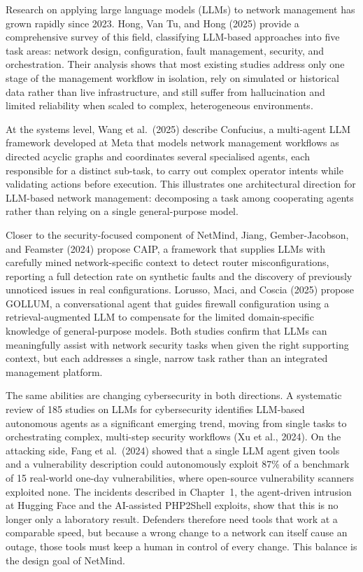 
Research on applying large language models (LLMs) to network management has
grown rapidly since 2023. Hong, Van Tu, and Hong (2025) provide a
comprehensive survey of this field, classifying LLM-based approaches into
five task areas: network design, configuration, fault management, security,
and orchestration. Their analysis shows that most existing studies address
only one stage of the management workflow in isolation, rely on simulated or
historical data rather than live infrastructure, and still suffer from
hallucination and limited reliability when scaled to complex, heterogeneous
environments.

At the systems level, Wang et al.\ (2025) describe Confucius, a multi-agent
LLM framework developed at Meta that models network management workflows as
directed acyclic graphs and coordinates several specialised agents, each
responsible for a distinct sub-task, to carry out complex operator intents
while validating actions before execution. This illustrates one architectural
direction for LLM-based network management: decomposing a task among
cooperating agents rather than relying on a single general-purpose model.

Closer to the security-focused component of NetMind, Jiang, Gember-Jacobson,
and Feamster (2024) propose CAIP, a framework that supplies LLMs with
carefully mined network-specific context to detect router misconfigurations,
reporting a full detection rate on synthetic faults and the discovery of
previously unnoticed issues in real configurations. Lorusso, Maci, and Coscia
(2025) propose GOLLUM, a conversational agent that guides firewall
configuration using a retrieval-augmented LLM to compensate for the limited
domain-specific knowledge of general-purpose models. Both studies confirm that
LLMs can meaningfully assist with network security tasks when given the right
supporting context, but each addresses a single, narrow task rather than an
integrated management platform.


The same abilities are changing cybersecurity in both directions. A
systematic review of 185 studies on LLMs for cybersecurity identifies
LLM-based autonomous agents as a significant emerging trend, moving from
single tasks to orchestrating complex, multi-step security workflows (Xu et
al., 2024). On the attacking side, Fang et al.\ (2024) showed that a single
LLM agent given tools and a vulnerability description could autonomously
exploit 87\% of a benchmark of 15 real-world one-day vulnerabilities, where
open-source vulnerability scanners exploited none. The incidents described
in Chapter~1, the agent-driven intrusion at Hugging Face and the AI-assisted
PHP2Shell exploits, show that this is no longer only a laboratory result.
Defenders therefore need tools that work at a comparable speed, but because
a wrong change to a network can itself cause an outage, those tools must
keep a human in control of every change. This balance is the design goal of
NetMind.

